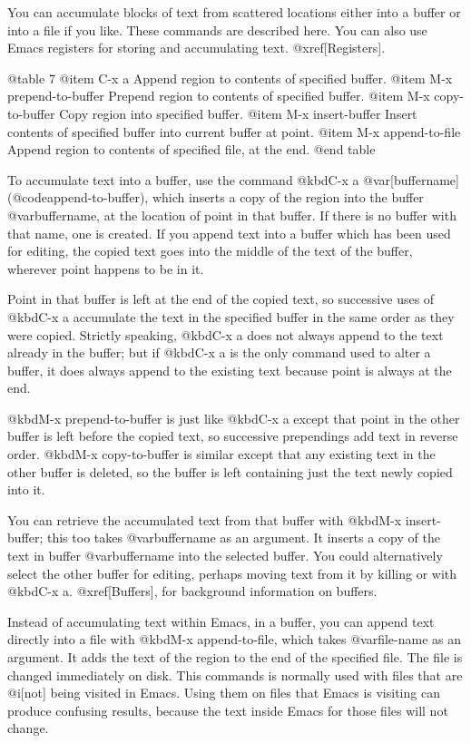 {{{{{{  You can accumulate blocks of text from scattered locations either
into a buffer or into a file if you like.  These commands are
described here.  You can also use Emacs registers for storing and
accumulating text.  @xref[Registers].

@table 7
@item C-x a
Append region to contents of specified buffer.
@item M-x prepend-to-buffer
Prepend region to contents of specified buffer.
@item M-x copy-to-buffer
Copy region into specified buffer.
@item M-x insert-buffer
Insert contents of specified buffer into current buffer at point.
@item M-x append-to-file
Append region to contents of specified file, at the end.
@end table

  To accumulate text into a buffer, use the command @kbd{C-x a
@var[buffername]} (@code{append-to-buffer}), which inserts a copy of the
region into the buffer @var{buffername}, at the location of point in that
buffer.  If there is no buffer with that name, one is created.  If you
append text into a buffer which has been used for editing, the copied text
goes into the middle of the text of the buffer, wherever point happens to
be in it.

  Point in that buffer is left at the end of the copied text, so successive
uses of @kbd{C-x a} accumulate the text in the specified buffer in the same
order as they were copied.  Strictly speaking, @kbd{C-x a} does not always
append to the text already in the buffer; but if @kbd{C-x a} is the only
command used to alter a buffer, it does always append to the existing text
because point is always at the end.

  @kbd{M-x prepend-to-buffer} is just like @kbd{C-x a} except
that point in the other buffer is left before the copied text, so
successive prependings add text in reverse order.  @kbd{M-x copy-to-buffer}
is similar except that any existing text in the other buffer is deleted, so
the buffer is left containing just the text newly copied into it.

  You can retrieve the accumulated text from that buffer with @kbd{M-x
insert-buffer}; this too takes @var{buffername} as an argument.  It inserts
a copy of the text in buffer @var{buffername} into the selected buffer.
You could alternatively select the other buffer for editing, perhaps moving
text from it by killing or with @kbd{C-x a}.  @xref[Buffers], for
background information on buffers.

  Instead of accumulating text within Emacs, in a buffer, you can append
text directly into a file with @kbd{M-x append-to-file}, which takes
@var{file-name} as an argument.  It adds the text of the region to the end
of the specified file.  The file is changed immediately on disk. This
commands is normally used with files that are @i[not] being visited in
Emacs.  Using them on files that Emacs is visiting can produce confusing
results, because the text inside Emacs for those files will not change.

}}}}}}
